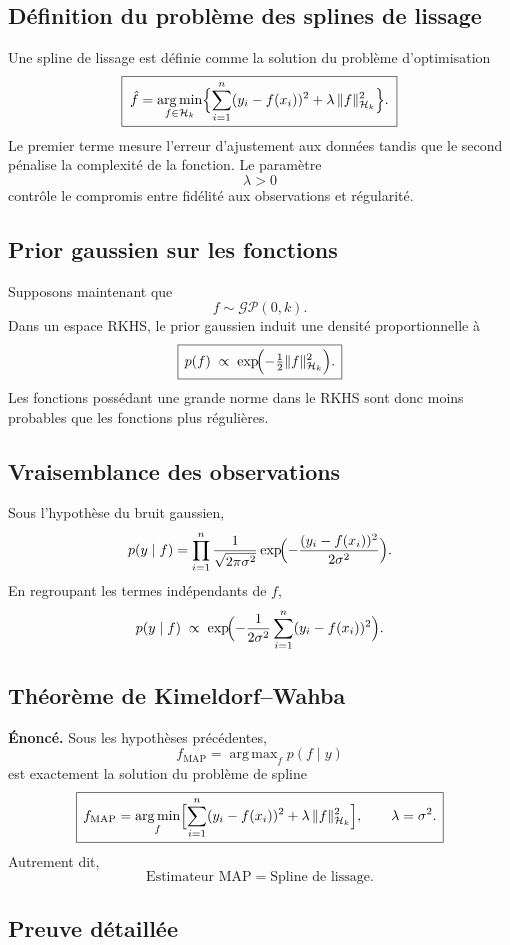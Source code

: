 \documentclass[12pt]{article}
\newcommand{\Hk}{\mathcal{H}_k}
\newcommand{\GP}{\mathcal{GP}}
\DeclareMathOperator*{\argmin}{arg\,min}
\DeclareMathOperator*{\argmax}{arg\,max}
\begin{document}
\subsection*{Définition du problème des splines de lissage}

Une spline de lissage est définie comme la solution du problème d'optimisation
\[
\boxed{\;
\hat f = \argmin_{f \in \Hk}
\Bigl\{ \sum_{i=1}^n (y_i - f(x_i))^2 + \lambda\,\|f\|_{\Hk}^2 \Bigr\}. \;}
\]
Le premier terme mesure l'erreur d'ajustement aux données tandis que le second
pénalise la complexité de la fonction. Le paramètre
\[
\lambda > 0
\]
contrôle le compromis entre fidélité aux observations et régularité.

\subsection*{Prior gaussien sur les fonctions}

Supposons maintenant que
\[
f \sim \GP(0,k).
\]
Dans un espace RKHS, le prior gaussien induit une densité proportionnelle à
\[
\boxed{\, p(f) \;\propto\; \exp\!\Bigl(-\tfrac12 \|f\|_{\Hk}^2\Bigr). \,}
\]
Les fonctions possédant une grande norme dans le RKHS sont donc moins probables
que les fonctions plus régulières.

\subsection*{Vraisemblance des observations}

Sous l'hypothèse du bruit gaussien,
\[
p(y \mid f) = \prod_{i=1}^n \frac{1}{\sqrt{2\pi\sigma^2}}
\exp\!\Bigl(-\frac{(y_i - f(x_i))^2}{2\sigma^2}\Bigr).
\]
En regroupant les termes indépendants de $f$,
\[
p(y \mid f) \;\propto\; \exp\!\Bigl(-\frac{1}{2\sigma^2}\sum_{i=1}^n (y_i - f(x_i))^2\Bigr).
\]

\subsection*{Théorème de Kimeldorf--Wahba}

\textbf{Énoncé.} Sous les hypothèses précédentes,
\[
\boxed{\, f_{\text{MAP}} = \argmax_f p(f \mid y) \,}
\]
est exactement la solution du problème de spline
\[
\boxed{\, f_{\text{MAP}} = \argmin_f
\Bigl[ \sum_{i=1}^n (y_i - f(x_i))^2 + \lambda\,\|f\|_{\Hk}^2 \Bigr],
\qquad \lambda = \sigma^2. \,}
\]
Autrement dit,
\[
\text{Estimateur MAP} = \text{Spline de lissage}.
\]

\subsection*{Preuve détaillée}
\end{document}
